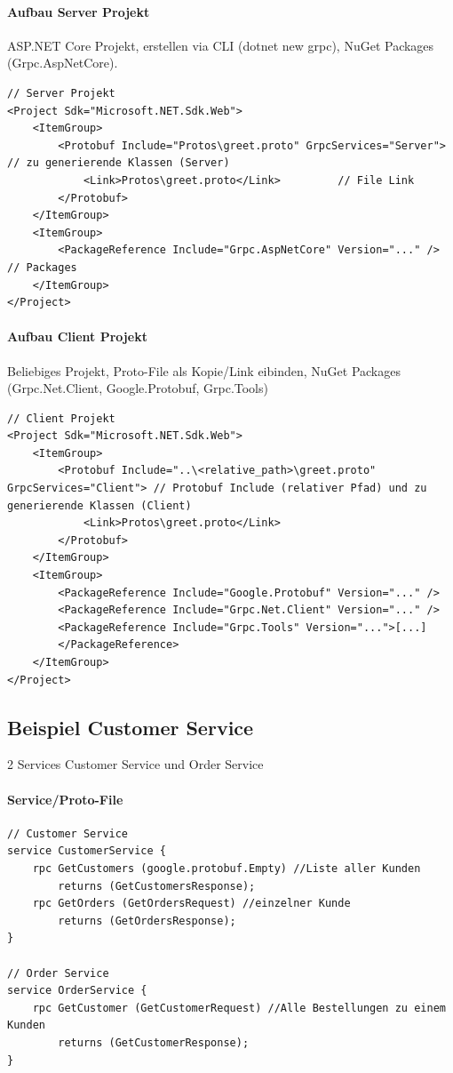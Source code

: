 \documentclass[
a4paper,
oneside,
10pt,
fleqn,
headsepline,
toc=listofnumbered, 
bibliography=totocnumbered]{scrartcl}
\begin{document}
\paragraph{Aufbau Server Projekt} ASP.NET Core Projekt, erstellen via CLI (dotnet new grpc), NuGet Packages (Grpc.AspNetCore).
\begin{lstlisting}
// Server Projekt
<Project Sdk="Microsoft.NET.Sdk.Web">
    <ItemGroup>
        <Protobuf Include="Protos\greet.proto" GrpcServices="Server"> // zu generierende Klassen (Server)
            <Link>Protos\greet.proto</Link>         // File Link
        </Protobuf>
    </ItemGroup>
    <ItemGroup>
        <PackageReference Include="Grpc.AspNetCore" Version="..." />  // Packages
    </ItemGroup>
</Project>
\end{lstlisting}

\paragraph{Aufbau Client Projekt} Beliebiges Projekt, Proto-File als Kopie/Link eibinden, NuGet Packages (Grpc.Net.Client, Google.Protobuf, Grpc.Tools)
\begin{lstlisting}
// Client Projekt
<Project Sdk="Microsoft.NET.Sdk.Web">
    <ItemGroup>
        <Protobuf Include="..\<relative_path>\greet.proto" GrpcServices="Client"> // Protobuf Include (relativer Pfad) und zu generierende Klassen (Client)
            <Link>Protos\greet.proto</Link>
        </Protobuf>
    </ItemGroup>
    <ItemGroup>
        <PackageReference Include="Google.Protobuf" Version="..." />
        <PackageReference Include="Grpc.Net.Client" Version="..." />
        <PackageReference Include="Grpc.Tools" Version="...">[...]
        </PackageReference>
    </ItemGroup>
</Project>
\end{lstlisting}

\subsection{Beispiel Customer Service} 2 Services Customer Service und Order Service
\paragraph{Service/Proto-File}
\begin{lstlisting}
// Customer Service
service CustomerService {
    rpc GetCustomers (google.protobuf.Empty) //Liste aller Kunden
        returns (GetCustomersResponse);
    rpc GetOrders (GetOrdersRequest) //einzelner Kunde 
        returns (GetOrdersResponse);
}

// Order Service
service OrderService {
    rpc GetCustomer (GetCustomerRequest) //Alle Bestellungen zu einem Kunden
        returns (GetCustomerResponse);
}
\end{lstlisting}
\end{document}
